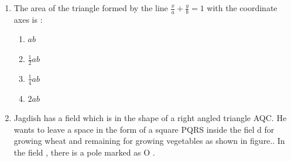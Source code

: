 \documentclass{article}
\begin{document}
\begin{enumerate}
        \item The area of the triangle formed by the line $ \frac{x}{a} + \frac{y}{b} = 1 $ with the coordinate axes is :
        \begin{enumerate}
             \item  $ ab $
             \item  $\frac{1}{2}ab$
             \item  $\frac{1}{4}ab$
             \item  $2ab$
        \end{enumerate}
	\item Jagdish has a field which is in the shape of a right angled triangle AQC. He wants to leave a space in the form of a square PQRS inside the fiel
d for growing wheat and remaining for growing vegetables as shown in figure.. In the field , there is a pole marked as O .


\end{enumerate}
\end{document}
